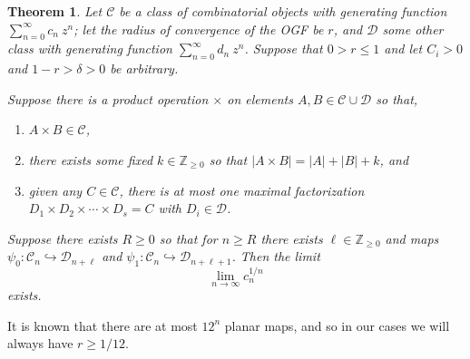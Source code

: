 \documentclass[amsmath,longbibliography,secnumarabic,floatfix,amssymb,nofootinbib,nobibnotes,letterpaper,11pt,notitlepage,tightenlines]{revtex4-1}
\newcommand{\Z}{\mathbb{Z}} \newcommand{\N}{\mathbb{N}}
\newcommand{\ArbClass}{\mathscr{C}}
\newcommand{\ArbSubClass}{\mathscr{D}}
\newcommand{\arbsubclass}{d}
\newcommand{\arbclass}{c}
\newtheorem{theorem}{Theorem}
\begin{document}
\begin{theorem}
  Let $\ArbClass$ be a class of combinatorial objects with generating function
  $\sum_{n=0}^{\infty}{\arbclass_n~z^n}$; let the radius of convergence of the OGF be $r$, and
  $\ArbSubClass$ some other class with generating function
  $\sum_{n=0}^{\infty}{\arbsubclass_n~z^n}$. Suppose that $0 > r \le 1$ and let $C_i > 0$ and
  $1-r>\delta>0$ be arbitrary.

  Suppose there is a product operation $\times$ on elements $A, B \in
  \ArbClass \cup \ArbSubClass$ so that,
  \begin{enumerate}
  \item $A \times B \in \ArbClass$,
  \item there exists some fixed $k \in \Z_{\ge 0}$ so that $|A \times B| = |A| + |B| + k$, and
  \item given any $C \in \ArbClass$, there is at most one maximal factorization $D_1 \times D_2 \times
    \cdots \times D_s = C$ with $D_i \in \ArbSubClass$.
  \end{enumerate}
  Suppose there exists $R \ge 0$ so that for $n \ge R$ there exists $\ell \in \Z_{\ge 0}$ and maps $\psi_0:
  \ArbClass_n \hookrightarrow \ArbSubClass_{n+\ell}$ and $ \psi_1: \ArbClass_n \hookrightarrow
  \ArbSubClass_{n+\ell+1}$. Then the limit
  \[ \lim_{n\to\infty}{\arbclass_n^{1/n}} \] exists.
\end{theorem}

It is known that there are at most $12^n$ planar maps, and so in our cases we will always have $r
\ge 1/12$.
\end{document}
